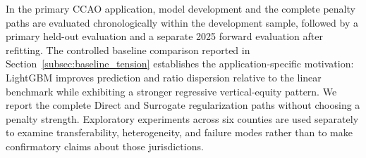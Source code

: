 \documentclass[10pt]{article}
\theoremstyle{definition}
\newcommand{\1}{\mathbf{1}}
\newcommand{\oldtext}[1]{\textcolor{blue}{\sout{#1}}}
\newcommand{\newtext}[1]{\textcolor{impGreen}{#1}}
\begin{document}

{In the primary CCAO application, model development and the complete penalty paths are evaluated chronologically within the development sample, followed by a primary held-out evaluation and a separate 2025 forward evaluation after refitting. The controlled baseline comparison reported in Section~\ref{subsec:baseline_tension} establishes the application-specific motivation: LightGBM improves prediction and ratio dispersion relative to the linear benchmark while exhibiting a stronger regressive vertical-equity pattern. 
\newtext{We report the complete Direct and Surrogate regularization paths} without choosing a penalty strength. Exploratory experiments across six counties are used separately to examine transferability, heterogeneity, and failure modes rather than to make confirmatory claims about those jurisdictions.}

\end{document}
